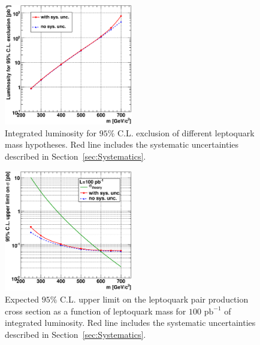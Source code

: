 \begin{figure}[h!]
 \centering
  \includegraphics[width=0.5\textwidth]{plots/cmsPotential/L95CL_vs_m_log.eps}
 \caption{Integrated luminosity
for $95\%$ C.L. exclusion of different leptoquark mass hypotheses. Red line includes the systematic
uncertainties described in Section~\ref{sec:Systematics}.\label{fig:exclusion}}
\end{figure}
\begin{figure}[h!]
 \centering
  \includegraphics[width=0.5\textwidth]{plots/cmsPotential/xs95CL_vs_m_log.eps}
 \caption{Expected $95\%$ C.L. upper limit on the leptoquark pair production cross section as a function of leptoquark mass for $100\text{ pb}^{-1}$
of integrated luminosity. Red line includes the systematic
uncertainties described in Section~\ref{sec:Systematics}.\label{fig:exclusion_xs}}
\end{figure}



